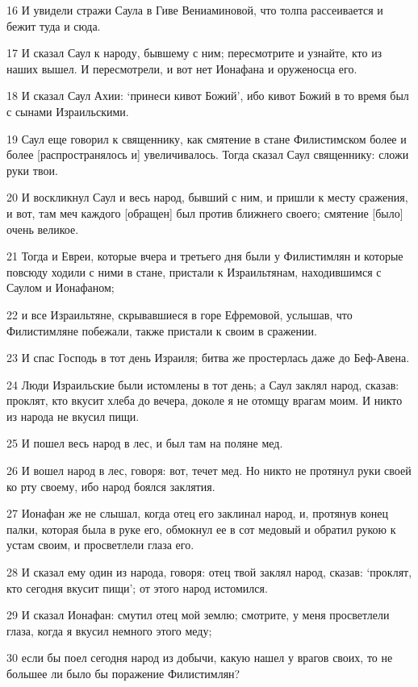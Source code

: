 \par 16 И увидели стражи Саула в Гиве Вениаминовой, что толпа рассеивается и бежит туда и сюда.
\par 17 И сказал Саул к народу, бывшему с ним; пересмотрите и узнайте, кто из наших вышел. И пересмотрели, и вот нет Ионафана и оруженосца его.
\par 18 И сказал Саул Ахии: `принеси кивот Божий', ибо кивот Божий в то время был с сынами Израильскими.
\par 19 Саул еще говорил к священнику, как смятение в стане Филистимском более и более [распространялось и] увеличивалось. Тогда сказал Саул священнику: сложи руки твои.
\par 20 И воскликнул Саул и весь народ, бывший с ним, и пришли к месту сражения, и вот, там меч каждого [обращен] был против ближнего своего; смятение [было] очень великое.
\par 21 Тогда и Евреи, которые вчера и третьего дня были у Филистимлян и которые повсюду ходили с ними в стане, пристали к Израильтянам, находившимся с Саулом и Ионафаном;
\par 22 и все Израильтяне, скрывавшиеся в горе Ефремовой, услышав, что Филистимляне побежали, также пристали к своим в сражении.
\par 23 И спас Господь в тот день Израиля; битва же простерлась даже до Беф-Авена.
\par 24 Люди Израильские были истомлены в тот день; а Саул заклял народ, сказав: проклят, кто вкусит хлеба до вечера, доколе я не отомщу врагам моим. И никто из народа не вкусил пищи.
\par 25 И пошел весь народ в лес, и был там на поляне мед.
\par 26 И вошел народ в лес, говоря: вот, течет мед. Но никто не протянул руки своей ко рту своему, ибо народ боялся заклятия.
\par 27 Ионафан же не слышал, когда отец его заклинал народ, и, протянув конец палки, которая была в руке его, обмокнул ее в сот медовый и обратил рукою к устам своим, и просветлели глаза его.
\par 28 И сказал ему один из народа, говоря: отец твой заклял народ, сказав: `проклят, кто сегодня вкусит пищи'; от этого народ истомился.
\par 29 И сказал Ионафан: смутил отец мой землю; смотрите, у меня просветлели глаза, когда я вкусил немного этого меду;
\par 30 если бы поел сегодня народ из добычи, какую нашел у врагов своих, то не большее ли было бы поражение Филистимлян?
